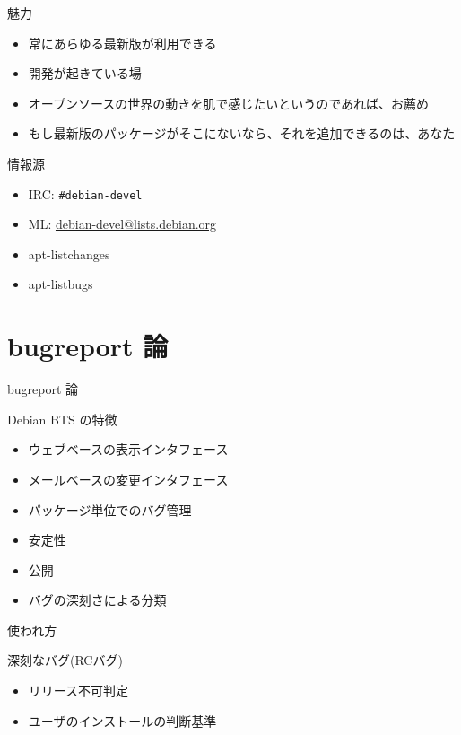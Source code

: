 \documentclass[cjk,dvipdfmx]{beamer}
\begin{document}
\begin{frame}{魅力}
 \begin{itemize}[<+->]
  \item 常にあらゆる最新版が利用できる
  \item 開発が起きている場
  \item オープンソースの世界の動きを肌で感じたいというのであれば、お薦め
  \item もし最新版のパッケージがそこにないなら、それを追加できるのは、あなた
 \end{itemize}
\end{frame}

\begin{frame}[containsverbatim]{情報源}
\begin{itemize}
 \item IRC: \verb!#debian-devel! 
 \item ML: \url{debian-devel@lists.debian.org}
 \item apt-listchanges
 \item apt-listbugs
\end{itemize}
\end{frame}

\section{bugreport 論}

\begin{frame}
\begin{center}
{\Huge bugreport 論}
\end{center}
\end{frame}

\begin{frame}{Debian BTS の特徴}
\begin{itemize}
 \item ウェブベースの表示インタフェース
 \item メールベースの変更インタフェース
 \item パッケージ単位でのバグ管理
 \item 安定性
 \item 公開
 \item バグの深刻さによる分類
\end{itemize}
\end{frame}

\begin{frame}{使われ方}

 深刻なバグ(RCバグ)

\begin{itemize}
 \item リリース不可判定
 \item ユーザのインストールの判断基準
\end{itemize}
\end{frame}
\end{document}
